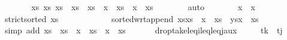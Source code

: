 \begin{isabellebody}
\ \ \ \ \isamarkupfalse%
\ \isamarkupfalse%
\ xs\ xs\ xs\ \ {\isachardoublequoteopen}xs\ {\isacharequal}{\kern0pt}\ xs\ {\isacharat}{\kern0pt}\ x\ {\isacharhash}{\kern0pt}\ xs\ {\isacharat}{\kern0pt}\ x\ {\isacharhash}{\kern0pt}\ xs\isanewline
\ \ \ \ \ \ \isamarkupfalse%
\ auto\isanewline
\ \ \ \ \isamarkupfalse%
\ \isamarkupfalse%
\ {\isachardoublequoteopen}x\ {\isacharless}{\kern0pt}\ x\isanewline
\ \ \ \ \ \ \isamarkupfalse%
\ {\isacartoucheopen}strict{\isacharunderscore}{\kern0pt}sorted\ xs{\isacartoucheclose}\isanewline
\ \ \ \ \ \ \ \ \ \ \ \ sorted{\isacharunderscore}{\kern0pt}wrt{\isacharunderscore}{\kern0pt}append{\isacharbrackleft}{\kern0pt}\ xs{\isacharequal}{\kern0pt}{\isachardoublequoteopen}xs\ {\isacharat}{\kern0pt}\ x\ {\isacharhash}{\kern0pt}\ xs\ \ ys{\isacharequal}{\kern0pt}{\isachardoublequoteopen}x\ {\isacharhash}{\kern0pt}\ xs\isanewline
\ \ \ \ \ \ \isamarkupfalse%
\ {\isacharparenleft}{\kern0pt}simp\ add{\isacharcolon}{\kern0pt}\ {\isacartoucheopen}xs\ {\isacharequal}{\kern0pt}\ xs\ {\isacharat}{\kern0pt}\ x\ {\isacharhash}{\kern0pt}\ xs\ {\isacharat}{\kern0pt}\ x\ {\isacharhash}{\kern0pt}\ xs\isanewline
\ \ \isamarkupfalse%
%
\endisatagproof
{\isafoldproof}%
%
\isadelimproof
\isanewline
%
\endisadelimproof
\isanewline
\ \ \isamarkupfalse%
\ drop{\isacharunderscore}{\kern0pt}take{\isacharunderscore}{\kern0pt}leq\isactrlsub i{\isacharunderscore}{\kern0pt}leq{\isacharunderscore}{\kern0pt}leq\isactrlsub j{\isacharunderscore}{\kern0pt}aux{\isacharcolon}{\kern0pt}\isanewline
\ \ \ \ \ {\isachardoublequoteopen}t\isactrlsub k\ {\isasymle}\ t\isactrlsub j{\isachardoublequoteclose}\isanewline

\end{isabellebody}

